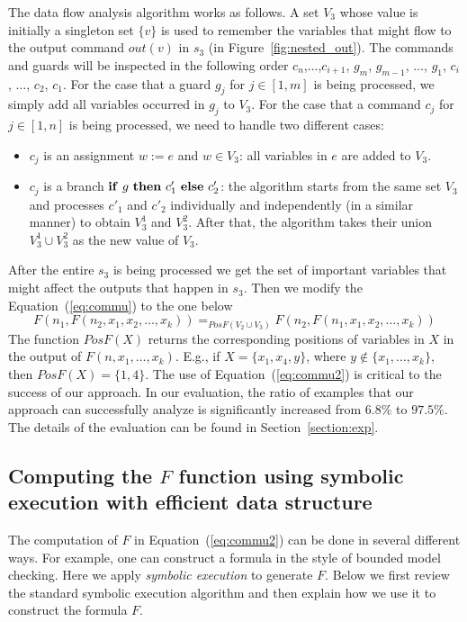 \documentclass{llncs}
\newcommand{\ite}[3]{
	 \ifmmode
	 \mathbf{if}\ #1 \ \mathbf{then}\ #2\  \mathbf{else}\ #3
	 \else
	 \textbf{if}\ #1 \ \textbf{then}\ #2\  \textbf{else}\ #3
	 \fi}
\begin{document}
The data flow analysis algorithm works as follows.
A set $V_3$ whose value is initially a singleton set $\{v\}$ is used to remember the variables that might flow to the output command $out(v)$ in $s_3$ (in Figure~\ref{fig:nested_out}).
The commands and guards will be inspected in the following order $c_{n}$,$\ldots$,$c_{i+1}$, $g_m$, $g_{m-1}$, $\ldots$, $g_1$, $c_i$, $\ldots$, $c_2$, $c_1$. For the case that a guard $g_j$ for $j\in [1,m]$ is being processed, we simply add all variables occurred in $g_j$ to $V_3$. 
For the case that a command $c_j$ for $j\in [1,n]$ is being processed, we need to handle two different cases:
\begin{itemize}
	\item $c_j$ is an assignment $w:=e$ and $w\in V_3$: all variables in $e$ are added to $V_3$. 
	\item $c_j$ is a branch $\ite{g}{c'_1}{c'_2}$: the algorithm starts from the same set $V_3$ and processes $c'_1$ and $c'_2$ individually and independently (in a similar manner) to obtain $V_3^1$ and $V_3^2$. After that, the algorithm takes their union $V_3^1\cup V_3^2$ as the new value of $V_3$.
\end{itemize}
After the entire $s_3$ is being processed we get the set of important variables that might affect the outputs that happen in $s_3$.
Then we modify the Equation~(\ref{eq:commu}) to the one below
\begin{equation}
F(n_1, F(n_2,x_1,x_2,\ldots,x_k) )=_{PosF(V_2\cup V_3)} F(n_2, F(n_1,x_1,x_2,\ldots,x_k) )
\label{eq:commu2}
\end{equation}
The function $PosF(X)$ returns the corresponding positions of variables in $X$ in the output of $F(n,x_1,\ldots,x_k) $. E.g., if $X = \{x_1,x_4,y\}$, where $y\notin \{x_1,\ldots,x_k\}$, then $PosF(X)=\{1,4\}$.
The use of Equation~(\ref{eq:commu2}) is critical to the success of our approach. In our evaluation, the ratio of examples that our approach can successfully analyze is significantly increased from $6.8\%$ to $97.5\%$. The details of the evaluation can be found in Section~\ref{section:exp}.

\subsection{Computing the $F$ function using symbolic execution with efficient data structure}
\label{section:opt2}

The computation of $F$ in Equation~(\ref{eq:commu2}) can be done in several different ways. For example, one can construct a formula in the style of bounded model checking. Here we apply \emph{symbolic execution} to generate $F$. Below we first review the standard symbolic execution algorithm and then explain how we use it to construct the formula $F$.
\end{document}

